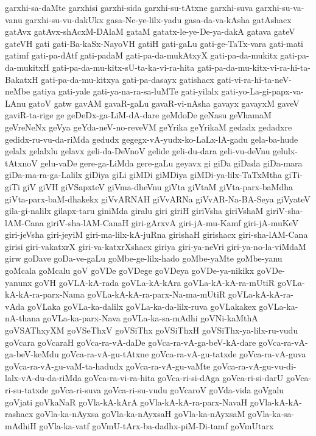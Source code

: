 {garxhi-sa-daMte
garxhisi
garxhi-sida
garxhi-su-tAtxne
garxhi-suva
garxhi-su-va-vanu
garxhi-su-vu-dakUkx
gasa-Ne-ye-lilx-yadu
gasa-da-va-kAsha
gatAshacx
gatAvx
gatAvx-shAcxM-DAlaM
gataM
gatatx-le-ye-De-ya-dakA
gatava
gateV
gateVH
gati
gati-Ba-kaSx-NayoVH
gatiH
gati-gaLu
gati-ge-TaTx-vara
gati-mati
gatimf
gati-pa-dAtf
gati-padaM
gati-pa-da-mukAtxyX
gati-pa-da-mukitx
gati-pa-da-mukitxH
gati-pa-da-mu-kitx-sU-ta-ka-vi-ra-hita
gati-pa-da-mu-kitx-vi-ra-hi-ta-BakatxH
gati-pa-da-mu-kitxya
gati-pa-dasayx
gatishacx
gati-vi-ra-hi-ta-neV-neMbe
gatiya
gati-yale
gati-ya-na-ra-sa-luMTe
gati-yilalx
gati-yo-La-gi-papx-va-LAnu
gatoV
gatw
gavAM
gavaR-gaLu
gavaR-vi-nAsha
gavayx
gavayxM
gaveV
gaviR-ta-rige
ge
geDeDx-ga-LiM-dA-dare
geMdoDe
geNasu
geVhamaM
geVreNeNx
geVya
geYda-neV-no-reveVM
geYrika
geYrikaM
gedadx
gedadxre
gedidx-ru-vu-da-riMda
gedudx
gegegx-vA-yudx-ko-LaLx-lA-gadu
gela-ba-hude
gelalx
gelalxlu
gelavx
geli-da-DeVnoV
gelide
geli-du-dara
geli-vu-deVnu
gelulx-tAtxnoV
gelu-vaDe
gere-ga-LiMda
gere-gaLu
geyavx
gi
giDa
giDada
giDa-mara
giDa-ma-ra-ga-Lalilx
giDiya
giLi
giMDi
giMDiya
giMDi-ya-lilx-TaTxMtha
giTi-giTi
giV
giVH
giVSapxteV
giVma-dheVnu
giVta
giVtaM
giVta-parx-baMdha
giVta-parx-baM-dhakekx
giVvARNAH
giVvARNa
giVvAR-Na-BA-Seya
giVyateV
gila-gi-nalilx
gilapx-taru
giniMda
giralu
giri
giriH
giriVsha
giriVshaM
giriV-sha-lAM-Cana
giriV-sha-lAM-CanaH
giri-gArxvA
giri-jA-mu-Kamf
giri-jA-muKeV
giri-jeVsha
giri-jeyiM
giri-ma-lilx-kA-juRna
girishaH
girishacx
giri-sha-lAM-Cana
girisi
giri-vakatxrX
giri-va-katxrXshacx
giriya
giri-ya-neVri
giri-ya-no-la-viMdaM
girw
goDave
goDa-ve-gaLu
goMbe-ge-lilx-hado
goMbe-yaMte
goMbe-yanu
goMcala
goMcalu
goV
goVDe
goVDege
goVDeya
goVDe-ya-nikikx
goVDe-yanunx
goVH
goVLA-kA-rada
goVLa-kA-kAra
goVLa-kA-kA-ra-mUtiR
goVLa-kA-kA-ra-parx-Nama
goVLa-kA-kA-ra-parx-Na-ma-mUtiR
goVLa-kA-kA-ra-vAda
goVLaka
goVLa-ka-dalilx
goVLa-ka-da-lilx-ruva
goVLakakex
goVLa-ka-nA-thana
goVLa-ka-parx-Nava
goVLa-ka-sa-mAdhi
goVNi-kaMthA
goVSAThxyXM
goVSeThxV
goVSiThx
goVSiThxH
goVSiThx-ya-lilx-ru-vudu
goVcara
goVcaraH
goVca-ra-vA-daDe
goVca-ra-vA-ga-beV-kA-dare
goVca-ra-vA-ga-beV-keMdu
goVca-ra-vA-gu-tAtxne
goVca-ra-vA-gu-tatxde
goVca-ra-vA-guva
goVca-ra-vA-gu-vaM-ta-hadudx
goVca-ra-vA-gu-vaMte
goVca-ra-vA-gu-vu-di-lalx-vA-du-da-riMda
goVca-ra-vi-ra-hita
goVca-ri-si-dAga
goVca-ri-si-darU
goVca-ri-su-tatxde
goVca-ri-suva
goVca-ri-su-vudu
goVcaroV
goVda-vida
goVgalu
goVjati
goVkaNaR
goVla-kA-kArA
goVla-kA-kA-ra-parx-NavaH
goVla-kA-kA-rashacx
goVla-ka-nAyxsa
goVla-ka-nAyxsaH
goVla-ka-nAyxsaM
goVla-ka-sa-mAdhiH
goVla-ka-vatf
goVmU-tArx-ba-dadhx-piM-Di-tamf
goVmUtarx
}
